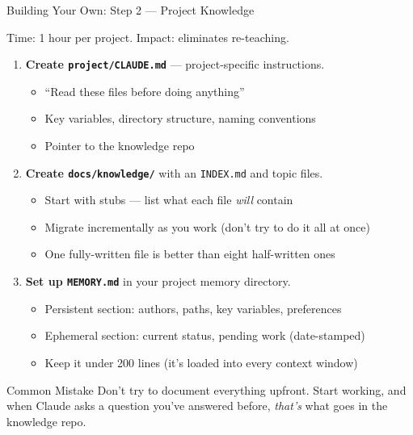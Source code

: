 \documentclass[aspectratio=169,11pt]{beamer}
\begin{document}
\begin{frame}[shrink=5]{Building Your Own: Step 2 --- Project Knowledge}

\begin{exampleblock}{Time: 1 hour per project. Impact: eliminates re-teaching.}
\end{exampleblock}

\begin{enumerate}\small
  \item \textbf{Create \texttt{project/CLAUDE.md}} --- project-specific instructions.
    \begin{itemize}\footnotesize
      \item ``Read these files before doing anything''
      \item Key variables, directory structure, naming conventions
      \item Pointer to the knowledge repo
    \end{itemize}

  \item \textbf{Create \texttt{docs/knowledge/}} with an \texttt{INDEX.md} and topic files.
    \begin{itemize}\footnotesize
      \item Start with stubs --- list what each file \textit{will} contain
      \item Migrate incrementally as you work (don't try to do it all at once)
      \item One fully-written file is better than eight half-written ones
    \end{itemize}

  \item \textbf{Set up \texttt{MEMORY.md}} in your project memory directory.
    \begin{itemize}\footnotesize
      \item Persistent section: authors, paths, key variables, preferences
      \item Ephemeral section: current status, pending work (date-stamped)
      \item Keep it under 200 lines (it's loaded into every context window)
    \end{itemize}
\end{enumerate}

\medskip

\begin{alertblock}{Common Mistake}
\small Don't try to document everything upfront. Start working, and when Claude asks a question you've answered before, \textit{that's} what goes in the knowledge repo.
\end{alertblock}

\end{frame}
\end{document}
